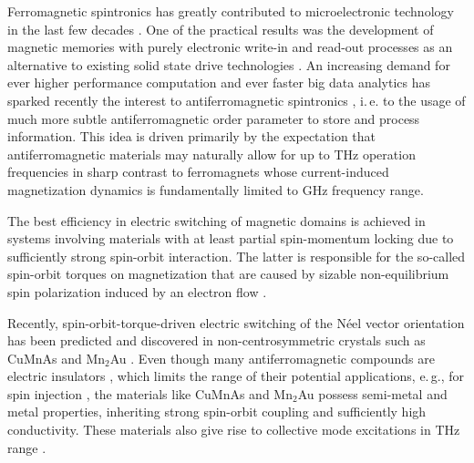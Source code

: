 Ferromagnetic spintronics has greatly contributed to microelectronic technology in the last few decades \cite{bader_spintronics_2010, sinova_new_2012, bhatti_spintronics_2017}. One of the practical results was the development of magnetic memories with purely electronic write-in and read-out processes as an alternative to existing solid state drive technologies \cite{kent_new_2015, sato_two-terminal_2018}. An increasing demand for ever higher performance computation and ever faster big data analytics has sparked recently the interest to antiferromagnetic spintronics \cite{macdonald_antiferromagnetic_2011, gomonay_spintronics_2014, wadley_electrical_2016, jungwirth_antiferromagnetic_2016, baltz_antiferromagnetic_2018, jungwirth_multiple_2018, jungfleisch_perspectives_2018}, i.\,e. to the usage of much more subtle antiferromagnetic order parameter to store and process information. This idea is driven primarily by the expectation that antiferromagnetic materials may naturally allow for up to THz operation frequencies \cite{gomonay_high_2016, olejnik_terahertz_2018, jungwirth_multiple_2018} in sharp contrast to ferromagnets whose current-induced magnetization dynamics is fundamentally limited to GHz frequency range. 
  
The best efficiency in electric switching of magnetic domains is achieved in systems involving materials with at least partial spin-momentum locking \cite{fina_electric_2017} due to sufficiently strong spin-orbit interaction. The latter is responsible for the so-called spin-orbit torques on magnetization that are caused by sizable non-equilibrium spin polarization induced by an electron flow \cite{brataas_current-induced_2012, Hals2013, zelezny_relativistic_2014, freimuth_spin-orbit_2014, ghosh_spin-orbit_2017, smejkal_electric_2017, zelezny_spin_2018, zhou_strong_2018, manchon_current-induced_2019, moriyama_spin-orbit-torque_2018, li_manipulation_2019, chen_electric_2019, zhou_large_2019, zhou_fieldlike_2019, bodnar_writing_2018}.  

Recently, spin-orbit-torque-driven electric switching of the N\'eel vector orientation has been predicted \cite{zelezny_relativistic_2014} and discovered in non-centrosymmetric crystals such as CuMnAs \cite{wadley_electrical_2016, fina_electric_2017, zelezny_spin_2018, saidl_optical_2017} and Mn$_2$Au \cite{barthem_revealing_2013, jourdan_epitaxial_2015, bhattacharjee_neel_2018}. Even though many antiferromagnetic compounds are electric insulators \cite{pandey_doping_2017}, which limits the range of their potential applications, e.\,g., for spin injection \cite{tshitoyan_electrical_2015}, the materials like CuMnAs and Mn$_2$Au possess  semi-metal and metal properties, inheriting strong spin-orbit coupling and sufficiently high conductivity. These materials also give rise to collective mode excitations in THz range \cite{bhattacharjee_neel_2018}. 

